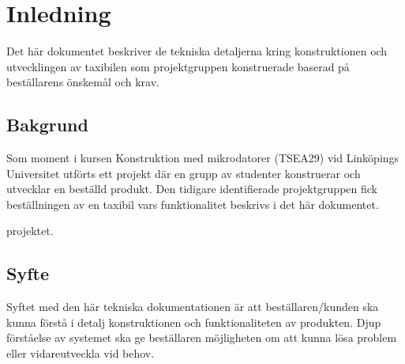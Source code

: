 \documentclass[tekniskrapport/tech.tex]{subfiles}
\begin{document}
\section{Inledning}
Det här dokumentet beskriver de tekniska detaljerna kring konstruktionen och utvecklingen av taxibilen som projektgruppen konstruerade baserad på beställarens önskemål och krav.    

\subsection{Bakgrund}
Som moment i kursen Konstruktion med mikrodatorer (TSEA29) vid Linköpings Universitet utförts ett projekt där en grupp av studenter konstruerar och utvecklar en beställd produkt. Den tidigare identifierade projektgruppen fick beställningen av en taxibil vars funktionalitet beskrivs i det här dokumentet. 

projektet.\cite{svensson-lips}

\subsection{Syfte}
Syftet med den här tekniska dokumentationen är att beställaren/kunden ska kunna förstå i detalj konstruktionen och funktionaliteten av produkten. Djup förståelse av systemet ska ge beställaren möjligheten om att kunna lösa problem eller vidareutveckla vid behov. 
\end{document}
